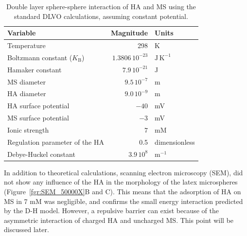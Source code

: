 \documentclass[journal=langd5,manuscript=article]{achemso}
\begin{document}
\begin{table}
\caption{Double layer sphere-sphere interaction  of HA and MS using the standard DLVO calculations, assuming constant potential.}
\label{tbl:dvlo_interaction}
\begin{tabular}{lrl}
Variable & Magnitude & Units\\
\hline
Temperature & 298 & K\\
Boltzmann constant ($K_\mathrm{B}$) & $1.3806\,10^{-23}$ & $\mathrm{J\, K^{-1}}$\\
Hamaker constant & $7.9\,10^{-21}$ & J\cite{Fronczak2017}\\
MS  diameter & $9.5\, 10^{-7}$ & m\\
HA  diameter & $9.0\, 10^{-9}$ & m\\
HA surface potential & $-40$ & mV\cite{Rodrigues2009}\\
MS surface potential & $-3$ & mV\cite{Kotera1970}\\
Ionic strength & $7$ & mM \\
Regulation parameter of the HA & 0.5 & dimensionless\cite{Ruiz-Cabello2013,Trefalt2014}\\
Debye-Huckel constant & $3.9\,10^8$ & $\mathrm{m^{-1}}$\\
\hline
\end{tabular}
\end{table}

In addition to theoretical calculations, scanning electron microscopy (SEM), did not show any influence of the HA in the morphology of the latex microspheres (Figure~\ref{fgr:SEM_50000X}B and C). This means that the adsorption of HA on MS in 7 mM  was negligible, and confirms the small energy interaction predicted by the D-H model. However, a repulsive barrier can exist because of the asymmetric interaction of charged HA and uncharged MS. This point will be discussed later.
\end{document}

